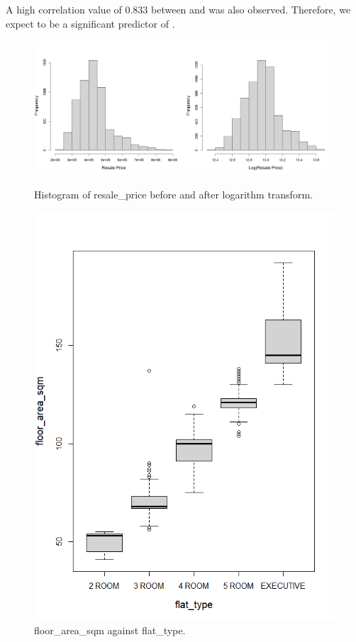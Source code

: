 A high correlation value of 0.833 between  and  was also observed. Therefore, we expect  to be a significant predictor of .

\begin{figure}
\centering
\begin{minipage}[t]{0.73\textwidth}
    \centering
    \includegraphics[width=\textwidth]{images/Screenshot 2023-04-11 175624.png}
    \caption{Histogram of resale\_price before and after logarithm transform.}
    \label{fig:histogram_transform}
\end{minipage}\hfill
\begin{minipage}[t]{0.26\textwidth}
  \centering
  \includegraphics[width=\textwidth]{images2/floor_area_sqm against flat_type.png}
  \caption{floor\_area\_sqm against flat\_type.}
  \label{fig: boxplot}
\end{minipage}
\end{figure}


